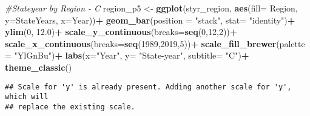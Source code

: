 \documentclass[
]{article}
\newenvironment{Shaded}{\begin{snugshade}}{\end{snugshade}}
\newcommand{\CommentTok}[1]{\textcolor[rgb]{0.56,0.35,0.01}{\textit{#1}}}
\newcommand{\DataTypeTok}[1]{\textcolor[rgb]{0.13,0.29,0.53}{#1}}
\newcommand{\DecValTok}[1]{\textcolor[rgb]{0.00,0.00,0.81}{#1}}
\newcommand{\FloatTok}[1]{\textcolor[rgb]{0.00,0.00,0.81}{#1}}
\newcommand{\KeywordTok}[1]{\textcolor[rgb]{0.13,0.29,0.53}{\textbf{#1}}}
\newcommand{\NormalTok}[1]{#1}
\newcommand{\OperatorTok}[1]{\textcolor[rgb]{0.81,0.36,0.00}{\textbf{#1}}}
\newcommand{\StringTok}[1]{\textcolor[rgb]{0.31,0.60,0.02}{#1}}
\begin{document}
\begin{Shaded}
\begin{Highlighting}[]
\CommentTok{#Stateyear by Region - C}
\NormalTok{region_p5 <-}\StringTok{ }\KeywordTok{ggplot}\NormalTok{(styr_region, }\KeywordTok{aes}\NormalTok{(}\DataTypeTok{fill=}\NormalTok{ Region, }\DataTypeTok{y=}\NormalTok{StateYears, }\DataTypeTok{x=}\NormalTok{Year))}\OperatorTok{+}
\StringTok{  }\KeywordTok{geom_bar}\NormalTok{(}\DataTypeTok{position =} \StringTok{"stack"}\NormalTok{, }\DataTypeTok{stat=} \StringTok{"identity"}\NormalTok{)}\OperatorTok{+}
\StringTok{  }\KeywordTok{ylim}\NormalTok{(}\DecValTok{0}\NormalTok{, }\FloatTok{12.0}\NormalTok{)}\OperatorTok{+}
\StringTok{  }\KeywordTok{scale_y_continuous}\NormalTok{(}\DataTypeTok{breaks=}\KeywordTok{seq}\NormalTok{(}\DecValTok{0}\NormalTok{,}\DecValTok{12}\NormalTok{,}\DecValTok{2}\NormalTok{))}\OperatorTok{+}
\StringTok{  }\KeywordTok{scale_x_continuous}\NormalTok{(}\DataTypeTok{breaks=}\KeywordTok{seq}\NormalTok{(}\DecValTok{1989}\NormalTok{,}\DecValTok{2019}\NormalTok{,}\DecValTok{5}\NormalTok{))}\OperatorTok{+}
\StringTok{  }\KeywordTok{scale_fill_brewer}\NormalTok{(}\DataTypeTok{palette =} \StringTok{"YlGnBu"}\NormalTok{)}\OperatorTok{+}
\StringTok{  }\KeywordTok{labs}\NormalTok{(}\DataTypeTok{x=}\StringTok{"Year"}\NormalTok{, }\DataTypeTok{y=} \StringTok{"State-year"}\NormalTok{, }\DataTypeTok{subtitle=} \StringTok{"C"}\NormalTok{)}\OperatorTok{+}
\StringTok{  }\KeywordTok{theme_classic}\NormalTok{()}
\end{Highlighting}
\end{Shaded}

\begin{verbatim}
## Scale for 'y' is already present. Adding another scale for 'y', which will
## replace the existing scale.
\end{verbatim}
\end{document}
